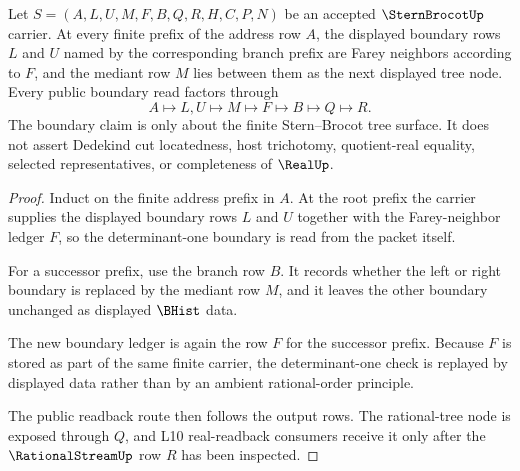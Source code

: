 \begin{theorem}
\label{thm:stern-brocot-farey-neighbor-boundary}
Let $S=(A,L,U,M,F,B,Q,R,H,C,P,N)$ be an accepted $\SternBrocotUp$ carrier. At every finite prefix of the address row $A$, the displayed boundary rows $L$ and $U$ named by the corresponding branch prefix are Farey neighbors according to $F$, and the mediant row $M$ lies between them as the next displayed tree node. Every public boundary read factors through
$$
A \longmapsto L,U \longmapsto M \longmapsto F \longmapsto B \longmapsto Q \longmapsto R .
$$
The boundary claim is only about the finite Stern--Brocot tree surface. It does not assert Dedekind cut locatedness, host trichotomy, quotient-real equality, selected representatives, or completeness of $\RealUp$.
\end{theorem}
\begin{proof}
Induct on the finite address prefix in $A$. At the root prefix the carrier supplies the displayed boundary rows $L$ and $U$ together with the Farey-neighbor ledger $F$, so the determinant-one boundary is read from the packet itself.

For a successor prefix, use the branch row $B$. It records whether the left or right boundary is replaced by the mediant row $M$, and it leaves the other boundary unchanged as displayed $\BHist$ data.

The new boundary ledger is again the row $F$ for the successor prefix. Because $F$ is stored as part of the same finite carrier, the determinant-one check is replayed by displayed data rather than by an ambient rational-order principle.

The public readback route then follows the output rows. The rational-tree node is exposed through $Q$, and L10 real-readback consumers receive it only after the $\RationalStreamUp$ row $R$ has been inspected.
\end{proof}

